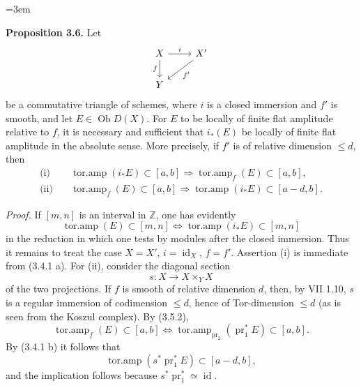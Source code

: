 \documentclass[11pt]{article}
\newcommand{\Spec}{\operatorname{Spec}}
\providecommand{\Coker}{\operatorname{Coker}}
\providecommand{\rank}{\operatorname{rank}}
\begin{document}
\providecommand{\Ob}{\operatorname{Ob}}
\providecommand{\D}{\mathrm D}
\providecommand{\Ho}{\mathrm H}
\providecommand{\RHom}{\mathrm R\!\operatorname{Hom}}
\providecommand{\parfamp}{\operatorname{parf.amp}}
\providecommand{\tamp}{\operatorname{tor.amp}}
\providecommand{\Qcoh}{\operatorname{Qcoh}}
\providecommand{\Mod}{\operatorname{Mod}}
\providecommand{\Coh}{\operatorname{Coh}}
\providecommand{\Lib}{\operatorname{Lib}}
\providecommand{\Loclib}{\operatorname{Loclib}}
\providecommand{\qcoh}{\mathrm{qcoh}}
\providecommand{\coh}{\mathrm{coh}}
\providecommand{\parf}{\mathrm{parf}}
\providecommand{\torf}{\mathrm{torf}}
\providecommand{\id}{\operatorname{id}}
\providecommand{\Coker}{\operatorname{Coker}}
\providecommand{\rank}{\operatorname{rank}}
\providecommand{\rg}{\operatorname{rg}}
\providecommand{\Hom}{\operatorname{Hom}}
\providecommand{\Ext}{\operatorname{Ext}}
\providecommand{\Spec}{\operatorname{Spec}}
\providecommand{\Cone}{\operatorname{Cone}}
\providecommand{\pt}{\operatorname{Pt}}
\providecommand{\ind}{\operatorname{ind}}
\emergencystretch=3em

\textbf{Proposition 3.6.} Let
\[
\begin{tikzcd}
X \arrow[r,"i"] \arrow[d,"f"'] & X' \arrow[dl,"f'"]\\
Y &
\end{tikzcd}
\]
be a commutative triangle of schemes, where \(i\) is a closed immersion and \(f'\) is smooth, and let \(E\in\Ob D(X)\). For \(E\) to be locally of finite flat amplitude relative to \(f\), it is necessary and sufficient that \(i_*(E)\) be locally of finite flat amplitude in the absolute sense. More precisely, if \(f'\) is of relative dimension \(\leq d\), then
\begin{align*}
\text{(i)}\quad &\tamp(i_*E)\subset[a,b] \Longrightarrow \tamp_f(E)\subset[a,b],\\
\text{(ii)}\quad &\tamp_f(E)\subset[a,b] \Longrightarrow \tamp(i_*E)\subset[a-d,b].
\end{align*}

\emph{Proof.} If \([m,n]\) is an interval in \(\mathbb Z\), one has evidently
\[
 \tamp(E)\subset[m,n] \Longleftrightarrow \tamp(i_*E)\subset[m,n]
\]
in the reduction in which one tests by modules after the closed immersion. Thus it remains to treat the case \(X=X'\), \(i=\id_X\), \(f=f'\). Assertion (i) is immediate from (3.4.1 a). For (ii), consider the diagonal section
\[
 s:X\longrightarrow X\times_YX
\]
of the two projections. If \(f\) is smooth of relative dimension \(d\), then, by VII 1.10, \(s\) is a regular immersion of codimension \(\leq d\), hence of Tor-dimension \(\leq d\) (as is seen from the Koszul complex). By (3.5.2),
\[
 \tamp_f(E)\subset[a,b]
 \Longleftrightarrow
 \tamp_{\operatorname{pr}_2}(\operatorname{pr}_1^*E)\subset[a,b].
\]
By (3.4.1 b) it follows that
\[
 \tamp(s^*\operatorname{pr}_1^*E)
 \subset[a-d,b],
\]
and the implication follows because \(s^*\operatorname{pr}_1^*\simeq\id\).
\end{document}
